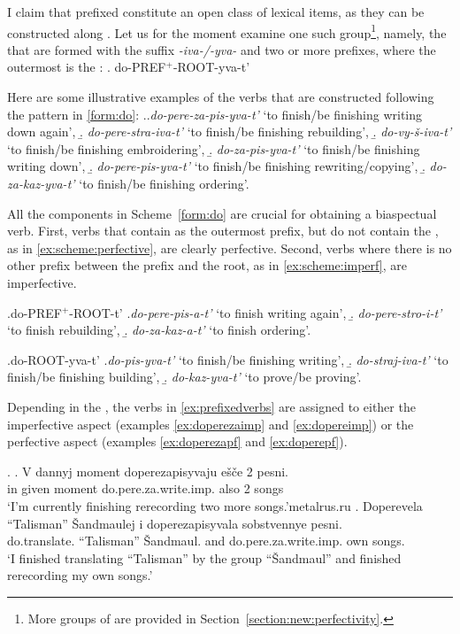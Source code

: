 I claim that prefixed  constitute an open class of lexical items, as they can be constructed along . Let us for the moment examine one such group\footnote{More groups of  are provided in Section~\ref{section:new:perfectivity}.}, namely, the  that are formed with the suffix \textit{-iva-/-yva-} and two or more prefixes, where the outermost is the :
\ex. \label{form:do}do-PREF$^{+}$-ROOT-yva-t'

Here are some illustrative examples of the verbs that are constructed following the pattern in \ref{form:do}: 
\ex.\label{ex:prefixedverbs}\a.\textit{do-pere-za-pis-yva-t'} `to finish/be finishing writing down again', 
\b. \textit{do-pere-stra-iva-t'} `to finish/be finishing rebuilding',
\b. \textit{do-vy-\v{s}-iva-t'} `to finish/be finishing embroidering',
\b. \textit{do-za-pis-yva-t'} `to finish/be finishing writing down', 
\b. \textit{do-pere-pis-yva-t'} `to finish/be finishing rewriting/copying', 
\b. \textit{do-za-kaz-yva-t'} `to finish/be finishing ordering'.

All the components in Scheme~\ref{form:do} are crucial for obtaining a biaspectual verb. First, verbs that contain  as the outermost prefix, but do not contain the , as in \ref{ex:scheme:perfective}, are clearly perfective. Second, verbs where there is no other prefix between the prefix  and the root, as in \ref{ex:scheme:imperf}, are imperfective.

\ex.\label{ex:scheme:perfective}do-PREF$^{+}$-ROOT-t'
\a.\textit{do-pere-pis-a-t'}\textsuperscript{\PF} `to finish writing again', 
\b. \textit{do-pere-stro-i-t'}\textsuperscript{\PF} `to finish rebuilding',
\b. \textit{do-za-kaz-a-t'}\textsuperscript{\PF} `to finish ordering'.

\ex.\label{ex:scheme:imperf}do-ROOT-yva-t'
\a.\textit{do-pis-yva-t'}\textsuperscript{\IPF} `to finish/be finishing writing', 
\b. \textit{do-straj-iva-t'}\textsuperscript{\IPF} `to finish/be finishing building',
\b. \textit{do-kaz-yva-t'}\textsuperscript{\IPF} `to prove/be proving'.

Depending in the , the verbs in \ref{ex:prefixedverbs} are assigned to either the imperfective aspect (examples \ref{ex:doperezaimp} and \ref{ex:dopereimp}) or the perfective aspect (examples \ref{ex:doperezapf} and \ref{ex:doperepf}). 

\ex. \ag. \label{ex:doperezaimp}V dannyj moment doperezapisyvaju e\v{s}\v{c}e 2 pesni.\\
in given moment do.pere.za.write.imp. also 2 songs\\
\trans `I'm currently finishing rerecording two more songs.'\hfill metalrus.ru
\bg. \label{ex:doperezapf}Doperevela ``Talisman'' \v{S}andmaulej i doperezapisyvala sobstvennye pesni.\\
do.translate. ``Talisman'' \v{S}andmaul. and do.pere.za.write.imp. own songs.\\
\trans `I finished translating ``Talisman'' by the group ``\v{S}andmaul'' and finished rerecording my own songs.'

